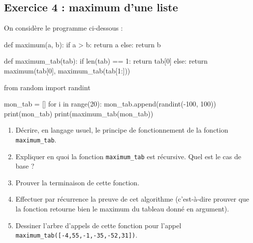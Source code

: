 \documentclass[
  a4paper,
  DIV=11,
  numbers=noendperiod]{scrartcl}
\newenvironment{Shaded}{\begin{snugshade}}{\end{snugshade}}
\newcommand{\BuiltInTok}[1]{\textcolor[rgb]{0.00,0.23,0.31}{#1}}
\newcommand{\ControlFlowTok}[1]{\textcolor[rgb]{0.00,0.23,0.31}{#1}}
\newcommand{\DecValTok}[1]{\textcolor[rgb]{0.68,0.00,0.00}{#1}}
\newcommand{\ImportTok}[1]{\textcolor[rgb]{0.00,0.46,0.62}{#1}}
\newcommand{\KeywordTok}[1]{\textcolor[rgb]{0.00,0.23,0.31}{#1}}
\newcommand{\NormalTok}[1]{\textcolor[rgb]{0.00,0.23,0.31}{#1}}
\newcommand{\OperatorTok}[1]{\textcolor[rgb]{0.37,0.37,0.37}{#1}}
\providecommand{\tightlist}{%
  \setlength{\itemsep}{0pt}\setlength{\parskip}{0pt}}\usepackage{longtable,booktabs,array}
\begin{document}
\hypertarget{fa-solid-pencil-alt-exercice-4-maximum-dune-liste}{%
\subsection{\texorpdfstring{ Exercice 4 : maximum
d'une
liste}{ Exercice 4 : maximum d'une liste}}\label{fa-solid-pencil-alt-exercice-4-maximum-dune-liste}}

On considère le programme ci-dessous :

\begin{Shaded}
\begin{Highlighting}[]
\KeywordTok{def}\NormalTok{ maximum(a, b):}
    \ControlFlowTok{if}\NormalTok{ a }\OperatorTok{\textgreater{}}\NormalTok{ b:}
        \ControlFlowTok{return}\NormalTok{ a}
    \ControlFlowTok{else}\NormalTok{:}
        \ControlFlowTok{return}\NormalTok{ b}

\KeywordTok{def}\NormalTok{ maximum\_tab(tab):}
    \ControlFlowTok{if} \BuiltInTok{len}\NormalTok{(tab) }\OperatorTok{==} \DecValTok{1}\NormalTok{:}
        \ControlFlowTok{return}\NormalTok{ tab[}\DecValTok{0}\NormalTok{]}
    \ControlFlowTok{else}\NormalTok{:}
        \ControlFlowTok{return}\NormalTok{ maximum(tab[}\DecValTok{0}\NormalTok{], maximum\_tab(tab[}\DecValTok{1}\NormalTok{:]))}

\ImportTok{from}\NormalTok{ random }\ImportTok{import}\NormalTok{ randint}

\NormalTok{mon\_tab }\OperatorTok{=}\NormalTok{ []}
\ControlFlowTok{for}\NormalTok{ i }\KeywordTok{in} \BuiltInTok{range}\NormalTok{(}\DecValTok{20}\NormalTok{):}
\NormalTok{    mon\_tab.append(randint(}\OperatorTok{{-}}\DecValTok{100}\NormalTok{, }\DecValTok{100}\NormalTok{))}
\BuiltInTok{print}\NormalTok{(mon\_tab)}
\BuiltInTok{print}\NormalTok{(maximum\_tab(mon\_tab))}
\end{Highlighting}
\end{Shaded}

\begin{enumerate}
\def\labelenumi{\arabic{enumi}.}
\tightlist
\item
  Décrire, en langage usuel, le principe de fonctionnement de la
  fonction \texttt{maximum\_tab}.
\item
  Expliquer en quoi la fonction \texttt{maximum\_tab} est récursive.
  Quel est le cas de base ?
\item
  Prouver la terminaison de cette fonction.
\item
  Effectuer par récurrence la preuve de cet algorithme (c'est-à-dire
  prouver que la fonction retourne bien le maximum du tableau donné en
  argument).
\item
  Dessiner l'arbre d'appels de cette fonction pour l'appel
  \texttt{maximum\_tab({[}-4,55,-1,-35,-52,31{]})}.
\end{enumerate}
\end{document}
